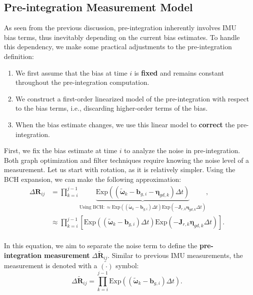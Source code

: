 \subsection{Pre-integration Measurement Model}
As seen from the previous discussion, pre-integration inherently involves IMU bias terms, thus inevitably depending on the current bias estimates. To handle this dependency, we make some practical adjustments to the pre-integration definition:
\begin{enumerate}
	\item We first assume that the bias at time $i$ is \textbf{fixed} and remains constant throughout the pre-integration computation.
	\item We construct a first-order linearized model of the pre-integration with respect to the bias terms, i.e., discarding higher-order terms of the bias.
	\item When the bias estimate changes, we use this linear model to \textbf{correct} the pre-integration.
\end{enumerate}

First, we fix the bias estimate at time $i$ to analyze the noise in pre-integration. Both graph optimization and filter techniques require knowing the noise level of a measurement. Let us start with rotation, as it is relatively simpler. Using the BCH expansion, we can make the following approximation:
\begin{equation}\label{key}
	\begin{aligned}
		\Delta \bm{R}_{ij} &= \prod_{k=i}^{j-1} \underbrace{\mathrm{Exp} \left( 
			\left(\tilde{\boldsymbol{\omega}}_k - \bm{b}_{g,i} - \boldsymbol{\eta}_{gd, k}\right)  \Delta 
			t\right)}_{\text{Using BCH}: \approx \mathrm{Exp}\left((\tilde{\boldsymbol{\omega}}_k - \bm{b}_{g,i})
			\Delta t \right) \mathrm{Exp} \left(-\bm{J}_{r,k} \boldsymbol{\eta}_{gd, k} \Delta t \right) }, \\
		&\approx \prod_{k=i}^{j-1} \left[ \mathrm{Exp}\left((\tilde{\boldsymbol{\omega}}_k - \bm{b}_{g,i}) 
		\Delta t \right) \mathrm{Exp} \left(-\bm{J}_{r,k} \boldsymbol{\eta}_{gd, k} \Delta t \right) \right].  \\
	\end{aligned}
\end{equation}

In this equation, we aim to separate the noise term to define the \textbf{pre-integration measurement} $\Delta \tilde{\bm{R}}_{ij}$. Similar to previous IMU measurements, the measurement is denoted with a $\tilde{(\cdot)}$ symbol:
\begin{equation}\label{eq:def-of-delta-R-obs}
	\Delta \tilde{\bm{R}}_{ij} = \prod_{k=i}^{j-1} \mathrm{Exp}\left( (\tilde{\boldsymbol{\omega}}_k - 
	\bm{b}_{g,i})\Delta t \right).
\end{equation}

